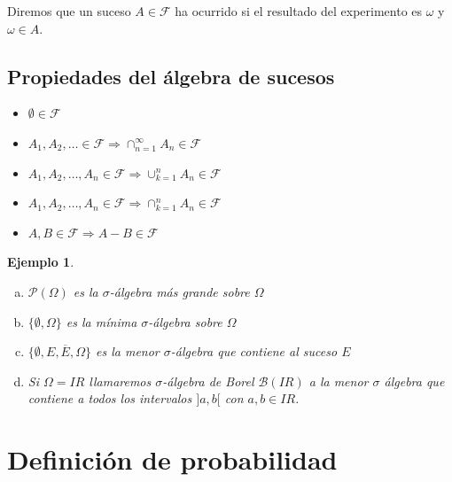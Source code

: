 \documentclass[12pt]{report}
\newtheorem{example}[definition]{Ejemplo}
\def\R{I\!\!R}
\begin{document}
         Diremos que un suceso $A\in \mathcal{F}$ ha ocurrido si el
         resultado del experimento es $\omega$ y $\omega\in A$.



         \subsection{Propiedades del álgebra de sucesos }
         \begin{itemize}
             \item  $\emptyset \in\mathcal{F}$

             \item  $A_{1},A_{2},\ldots\in\mathcal{F}\Longrightarrow
     \cap_{n=1}^{\infty} A_{n}\in\mathcal{F}$

             \item  $A_{1},A_{2},\ldots,A_{n}\in\mathcal{F}\Longrightarrow
     \cup_{k=1}^{n} A_{n}\in\mathcal{F}$

             \item  $A_{1},A_{2},\ldots,A_{n}\in\mathcal{F}\Longrightarrow
     \cap_{k=1}^{n} A_{n}\in\mathcal{F}$

             \item  $A,B\in\mathcal{F}\Longrightarrow A-B\in\mathcal{F}$
         \end{itemize}



\begin{example}
         \begin{enumerate}[a)]
         \item $\mathcal{P}(\Omega)$ es la  $\sigma$-álgebra más grande
         sobre $\Omega$
         \item $\{\emptyset,\Omega\}$ es la mínima $\sigma$-álgebra
         sobre $\Omega$
         \item $\{\emptyset, E,\overline{E},\Omega\}$ es la menor
         $\sigma$-álgebra que contiene al suceso $E$
         \item Si $\Omega=\R$ llamaremos $\sigma$-álgebra de Borel
          $\mathcal{B}(\R)$ a la menor $\sigma$
         álgebra que contiene a todos los intervalos $]a,b[$ con $a,b\in \R$.
         \end{enumerate}
\end{example}



         \section{Definición de probabilidad}
\end{document}
